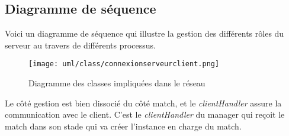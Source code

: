 \documentclass[a4paper,titlepage]{scrreprt}
\begin{document}
  \subsection{Diagramme de séquence}
  Voici un diagramme de séquence qui illustre la gestion des différents
  rôles du serveur au travers de différents processus.
    \begin{figure}[H]
    \center
    \texttt{[image: uml/class/connexionserveurclient.png]}
    \caption{Diagramme des classes impliquées dans le réseau}
    \end{figure}	
  Le côté gestion est bien dissocié du côté match, et le \emph{clientHandler} assure la communication avec le client.
  C'est le \emph{clientHandler} du manager qui reçoit le match dans son stade
  qui va créer l'instance en charge du match.
  

\printindex
\end{document}
